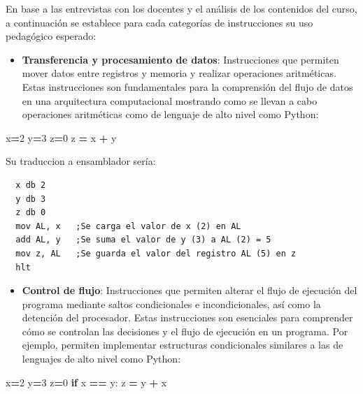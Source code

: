 \documentclass[12pt,oneside]{templates/unerthesis}
\newenvironment{Shaded}{\begin{snugshade}}{\end{snugshade}}
\newcommand{\ControlFlowTok}[1]{\textcolor[rgb]{0.13,0.29,0.53}{\textbf{#1}}}
\newcommand{\DecValTok}[1]{\textcolor[rgb]{0.00,0.00,0.81}{#1}}
\newcommand{\NormalTok}[1]{#1}
\newcommand{\OperatorTok}[1]{\textcolor[rgb]{0.81,0.36,0.00}{\textbf{#1}}}
\providecommand{\tightlist}{%
  \setlength{\itemsep}{0pt}\setlength{\parskip}{0pt}}
\begin{document}
En base a las entrevistas con los docentes y el análisis de los contenidos del curso, a continuación se establece para cada categorías de instrucciones su uso pedagógico esperado:

\begin{itemize}
\tightlist
\item
  \textbf{Transferencia y procesamiento de datos}: Instrucciones que permiten mover datos entre registros y memoria y realizar operaciones aritméticas. Estas instrucciones son fundamentales para la comprensión del flujo de datos en una arquitectura computacional mostrando como se llevan a cabo operaciones aritméticas como de lenguaje de alto nivel como Python:
\end{itemize}

\begin{Shaded}
\begin{Highlighting}[]
\NormalTok{x}\OperatorTok{=}\DecValTok{2}
\NormalTok{y}\OperatorTok{=}\DecValTok{3}
\NormalTok{z}\OperatorTok{=}\DecValTok{0}
\NormalTok{z }\OperatorTok{=}\NormalTok{ x }\OperatorTok{+}\NormalTok{ y}
\end{Highlighting}
\end{Shaded}

Su traduccion a ensamblador sería:

\begin{lstlisting}
  x db 2
  y db 3
  z db 0
  mov AL, x   ;Se carga el valor de x (2) en AL
  add AL, y   ;Se suma el valor de y (3) a AL (2) = 5
  mov z, AL   ;Se guarda el valor del registro AL (5) en z 
  hlt\end{lstlisting}

\begin{itemize}
\tightlist
\item
  \textbf{Control de flujo}: Instrucciones que permiten alterar el flujo de ejecución del programa mediante saltos condicionales e incondicionales, así como la detención del procesador. Estas instrucciones son esenciales para comprender cómo se controlan las decisiones y el flujo de ejecución en un programa. Por ejemplo, permiten implementar estructuras condicionales similares a las de lenguajes de alto nivel como Python:
\end{itemize}

\begin{Shaded}
\begin{Highlighting}[]
\NormalTok{x}\OperatorTok{=}\DecValTok{2}
\NormalTok{y}\OperatorTok{=}\DecValTok{3}
\NormalTok{z}\OperatorTok{=}\DecValTok{0}
\ControlFlowTok{if}\NormalTok{ x }\OperatorTok{==}\NormalTok{ y:}
\NormalTok{  z }\OperatorTok{=}\NormalTok{ y  }\OperatorTok{+}\NormalTok{ x}
\end{Highlighting}
\end{Shaded}
\end{document}
